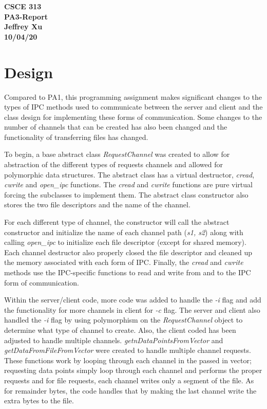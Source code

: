 \documentclass[12pt]{article}
\begin{document}
\begin{center}

{\bf
CSCE 313\\
PA3-Report\\
Jeffrey Xu\\
10/04/20\\
}

\end{center}

\section{Design}

Compared to PA1, this programming assignment makes significant changes to the types of IPC methods used to communicate between the server and client and the class design for implementing these forms of communication. Some changes to the number of channels that can be created has also been changed and the functionality of transferring files has changed. 

To begin, a base abstract class \emph{RequestChannel} was created to allow for abstraction of the different types of requests channels and allowed for polymorphic data structures. The abstract class has a virtual destructor, \emph{cread}, \emph{cwrite} and \emph{open\_ipc} functions. The \emph{cread} and \emph{cwrite} functions are pure virtual forcing the subclasses to implement them. The abstract class constructor also stores the two file descriptors and the name of the channel. 

For each different type of channel, the constructor will call the abstract constructor and initialize the name of each channel path (\emph{s1, s2}) along with calling \emph{open\_ipc} to initialize each file descriptor (except for shared memory). Each channel destructor also properly closed the file descriptor and cleaned up the memory associated with each form of IPC. Finally, the \emph{cread} and \emph{cwrite} methods use the IPC-specific functions to read and write from and to the IPC form of communication. 

Within the server/client code, more code was added to handle the \emph{-i} flag and add the functionality for more channels in client for \emph{-c} flag. The server and client also handled the \emph{-i} flag by using polymorphism on the \emph{RequestChannel} object to determine what type of channel to create. Also, the client coded has been adjusted to handle multiple channels. \emph{getnDataPointsFromVector} and \emph{getDataFromFileFromVector} were created to handle multiple channel requests. These functions work by looping through each channel in the passed in vector; requesting data points simply loop through each channel and performs the proper requests and for file requests, each channel writes only a segment of the file. As for remainder bytes, the code handles that by making the last channel write the extra bytes to the file. 
\end{document}
